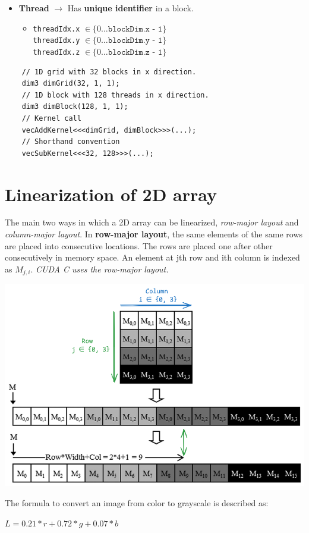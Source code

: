 \begin{itemize}
\begin{itemize}
          \end{itemize}
    \item \textbf{Thread} $\rightarrow$ Has \textbf{unique identifier} in a block.
          \begin{itemize}
              \item \texttt{threadIdx.x} $\in \{0 \dots \texttt{blockDim.x - 1} \}$\\\texttt{threadIdx.y} $\in \{0 \dots \texttt{blockDim.y - 1} \}$\\\texttt{threadIdx.z} $\in \{0 \dots \texttt{blockDim.z - 1} \}$
          \end{itemize}
\end{itemize}

\begin{verbatim}
    // 1D grid with 32 blocks in x direction.
    dim3 dimGrid(32, 1, 1);
    // 1D block with 128 threads in x direction.
    dim3 dimBlock(128, 1, 1);
    // Kernel call
    vecAddKernel<<<dimGrid, dimBlock>>>(...);
    // Shorthand convention
    vecSubKernel<<<32, 128>>>(...);
\end{verbatim}

\section{Linearization of 2D array}
The main two ways in which a 2D array can be linearized, \textit{row-major layout} and \textit{column-major layout}. In \textbf{row-major layout}, the same elements of the same rows are placed into consecutive locations. The rows are placed one after other consecutively in memory space. An element at jth row and ith column is indexed as $M_{j, i}$. \textit{CUDA C uses the row-major layout.}
\begin{center}
    \includegraphics[width=0.7\linewidth]{Images/MultiDim_Grid/Linearizing_array.png}
\end{center}
\bigskip
The formula to convert an image from color to grayscale is described as:
\begin{center}
    $L = 0.21*r + 0.72*g + 0.07*b$
\end{center}

